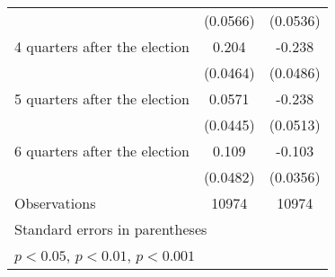 \begin{table}[htbp]
\begin{tabular}{l*{2}{c}}
                    &    (0.0566)         &    (0.0536)         \\
[1em]
 4 quarters after the election&       0.204\sym{***}&      -0.238\sym{***}\\
                    &    (0.0464)         &    (0.0486)         \\
[1em]
 5 quarters after the election&      0.0571         &      -0.238\sym{***}\\
                    &    (0.0445)         &    (0.0513)         \\
[1em]
 6 quarters after the election&       0.109\sym{*}  &      -0.103\sym{**} \\
                    &    (0.0482)         &    (0.0356)         \\
\hline
Observations        &       10974         &       10974         \\
\hline\hline
\multicolumn{3}{l}{\footnotesize Standard errors in parentheses}\\
\multicolumn{3}{l}{\footnotesize \sym{*} \(p<0.05\), \sym{**} \(p<0.01\), \sym{***} \(p<0.001\)}\\
\end{tabular}
\end{table}
